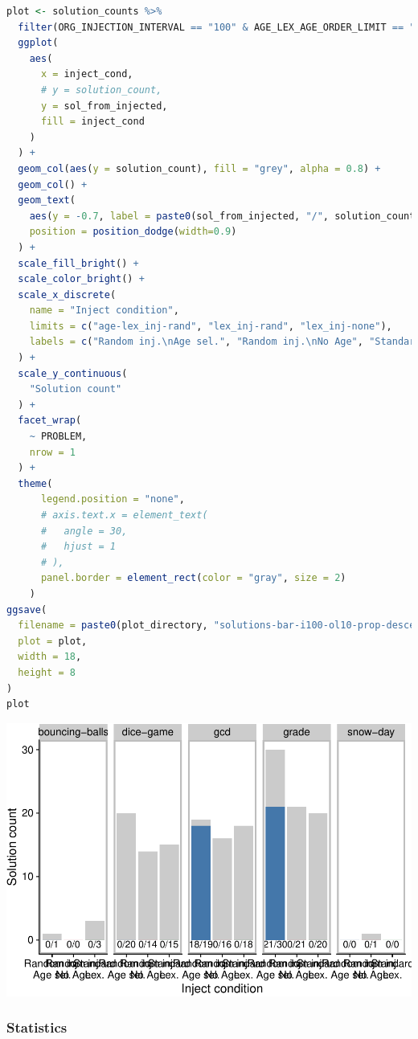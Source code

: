 \documentclass[
]{book}
\begin{document}
\begin{lstlisting}[language=R]
plot <- solution_counts %>%
  filter(ORG_INJECTION_INTERVAL == "100" & AGE_LEX_AGE_ORDER_LIMIT == "10") %>%
  ggplot(
    aes(
      x = inject_cond,
      # y = solution_count,
      y = sol_from_injected,
      fill = inject_cond
    )
  ) +
  geom_col(aes(y = solution_count), fill = "grey", alpha = 0.8) +
  geom_col() +
  geom_text(
    aes(y = -0.7, label = paste0(sol_from_injected, "/", solution_count)),
    position = position_dodge(width=0.9)
  ) +
  scale_fill_bright() +
  scale_color_bright() +
  scale_x_discrete(
    name = "Inject condition",
    limits = c("age-lex_inj-rand", "lex_inj-rand", "lex_inj-none"),
    labels = c("Random inj.\nAge sel.", "Random inj.\nNo Age", "Standard\nLex.")
  ) +
  scale_y_continuous(
    "Solution count"
  ) +
  facet_wrap(
    ~ PROBLEM,
    nrow = 1
  ) +
  theme(
      legend.position = "none",
      # axis.text.x = element_text(
      #   angle = 30,
      #   hjust = 1
      # ),
      panel.border = element_rect(color = "gray", size = 2)
    )
ggsave(
  filename = paste0(plot_directory, "solutions-bar-i100-ol10-prop-descend.pdf"),
  plot = plot,
  width = 18,
  height = 8
)
plot
\end{lstlisting}

\includegraphics{age-based-lex-supplemental_files/figure-latex/unnamed-chunk-9-1.pdf}

\hypertarget{statistics}{%
\subsubsection{Statistics}\label{statistics}}
\end{document}
